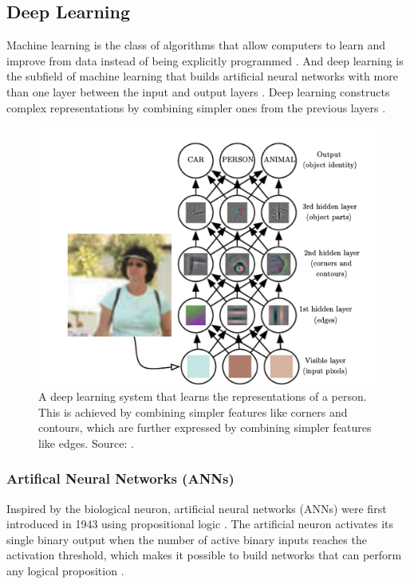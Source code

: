 \documentclass[a4paper, 11pt, oneside]{article}
\begin{document}
\subsection{Deep Learning}

Machine learning is the class of algorithms that allow computers to learn and improve from data instead of being
explicitly programmed \cite{samuel1959some, geron2019hands}. And deep learning is the subfield of machine learning that
builds artificial neural networks with more than one layer between the input and output layers
\cite{geron2019hands, burkov2019hundred, zhang2018definition}. Deep learning constructs complex representations by
combining simpler ones from the previous layers \cite{goodfellow2016deep}.

\begin{figure}[ht]
  \begin{center}
    \includegraphics[width=.8\textwidth]{deep_learning.png}
  \end{center}
  \caption{A deep learning system that learns the representations of a person. This is achieved by combining simpler
  features like corners and contours, which are further expressed by combining simpler features like edges. Source:
  \cite{goodfellow2016deep}.}
\end{figure}

\subsubsection{Artifical Neural Networks (ANNs)}

Inspired by the biological neuron, artificial neural networks (ANNs) were first introduced in 1943 using propositional
logic \cite{mcculloch1943logical}. The artificial neuron activates its single binary output when the number of active
binary inputs reaches the activation threshold, which makes it possible to build networks that can perform any logical
proposition \cite{geron2019hands, mcculloch1943logical}.
\end{document}
